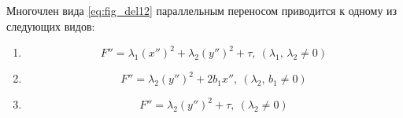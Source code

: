 \begin{lemma}
  Многочлен вида \ref{eq:fig_del12} параллельным переносом приводится к одному из следующих видов:
  \begin{enumerate}
    \item \begin{equation}
      \label{eq:lemma_1}
      F'' = \lambda_1(x'')^2 + \lambda_2(y'')^2 + \tau, ~ (\lambda_1,\, \lambda_2 \neq 0)
    \end{equation}
    \item \begin{equation}
      \label{eq:lemma_2}
      F'' = \lambda_2(y'')^2 + 2b_1x'', ~ (\lambda_2, \, b_1 \neq 0)
    \end{equation}
      \item \begin{equation}
        \label{eq:lemma_3}
        F'' = \lambda_2(y'')^2 + \tau, ~ (\lambda_2 \neq 0)
      \end{equation}
  \end{enumerate}
\end{lemma}
